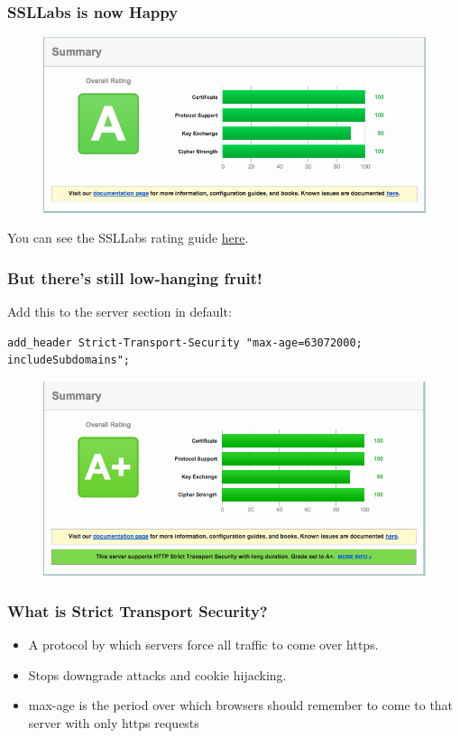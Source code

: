 \documentclass[9pt]{beamer}
\begin{document}
\begin{frame}[fragile]
\frametitle{SSLLabs is now Happy}
\begin{figure}
\includegraphics[scale=0.25]{figures/SSLLabsA.png}
\end{figure}
You can see the SSLLabs rating guide \href{https://www.ssllabs.com/downloads/SSL_Server_Rating_Guide.pdf}{here}.
\end{frame}

\begin{frame}[fragile]
\frametitle{But there's still low-hanging fruit!}
Add this to the server section in default:
\begin{verbatim}
add_header Strict-Transport-Security "max-age=63072000; includeSubdomains";
\end{verbatim}
\begin{figure}
\includegraphics[scale=0.25]{figures/SSLLabsAp.png}
\end{figure}
\end{frame}

\begin{frame}[fragile]
\frametitle{What is Strict Transport Security?}
\begin{itemize}
\item A protocol by which servers force all traffic to come over https.
\item Stops downgrade attacks and cookie hijacking.
\item max-age is the period over which browsers should remember to come to that server with only https requests
\end{itemize}
\end{frame}
\end{document}
